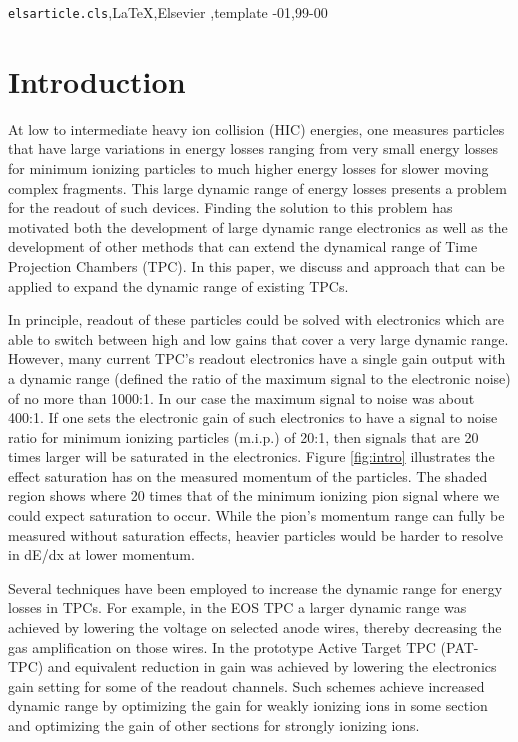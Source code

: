 \documentclass[review]{elsarticle}
\begin{document}
\begin{frontmatter}
\begin{keyword}
\texttt{elsarticle.cls}\sep \LaTeX\sep Elsevier \sep template
-01\sep  99-00
\end{keyword}

\end{frontmatter}

\linenumbers

\section{Introduction} 
 At low to intermediate heavy ion collision (HIC) energies, one measures particles that have large variations in energy losses ranging from very small energy losses for minimum ionizing particles to much higher energy losses for slower moving complex fragments. This large dynamic range of energy losses presents a problem for the readout of such devices. Finding the solution to this problem has motivated both the development of large dynamic range electronics as well as the development of other methods that can extend the dynamical range of Time Projection Chambers (TPC). In this paper, we discuss and approach that can be applied to expand the dynamic range of existing TPCs.
 
 In principle, readout of these particles could be solved with electronics which are able to switch between high and low gains that cover a very large dynamic range. However, many current TPC's readout electronics have a single gain output with a dynamic range (defined the ratio of the maximum signal to the electronic noise) of no more than 1000:1. In our case the maximum signal to noise was about 400:1. If one sets the electronic gain of such electronics to have a signal to noise ratio for minimum ionizing particles (m.i.p.) of 20:1, then signals that are 20 times larger will be saturated in the electronics. Figure \ref{fig:intro} illustrates the effect saturation has on the measured momentum of the particles. The shaded region shows where 20 times that of the minimum ionizing pion signal where we could expect saturation to occur. While the pion's momentum range can fully be measured without saturation effects, heavier particles would be harder to resolve in dE/dx at lower momentum. 

 Several techniques have been employed to increase the dynamic range for energy losses in TPCs. For example, in the EOS TPC \cite{eos} a larger dynamic range was achieved by lowering the voltage on selected anode wires, thereby decreasing the gas amplification on those wires. In the prototype Active Target TPC (PAT-TPC) and equivalent reduction in gain was achieved by lowering  the electronics gain setting for some of the readout channels. Such schemes achieve increased dynamic range by optimizing the gain for weakly ionizing ions in some section and optimizing the gain of other sections for strongly ionizing ions. 
 
\end{document}
